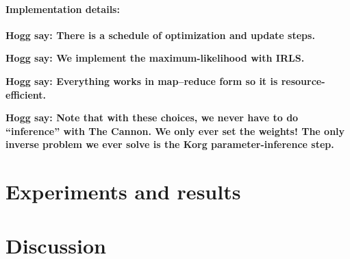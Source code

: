 \documentclass{article}
\newcommand{\hogg}[1]{\textbf{\color{blue} Hogg say: #1}}
\begin{document}
\paragraph{Implementation details:}
\hogg{There is a schedule of optimization and update steps.}

\hogg{We implement the maximum-likelihood with IRLS.}

\hogg{Everything works in map--reduce form so it is resource-efficient.}

\hogg{Note that with these choices, we never have to do ``inference'' with The Cannon. We only ever set the weights! The only inverse problem we ever solve is the Korg parameter-inference step.}

\section{Experiments and results}

\section{Discussion}
\end{document}
